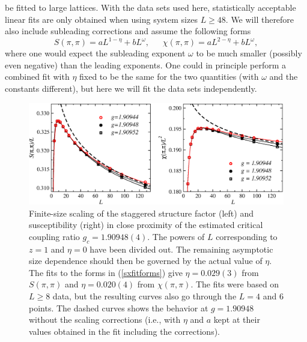 \documentclass[draft,numberedheadings]{aipproc}
\begin{document}
be fitted to large lattices. With the data sets used here, statistically acceptable linear fits are only obtained when using system sizes $L\ge 48$. We will 
therefore also include subleading corrections and assume the following forms
\begin{equation}
S(\pi,\pi) = aL^{1-\eta}+bL^{\omega},~~~~~~~\chi(\pi,\pi) = aL^{2-\eta}+bL^{\omega},
\label{sxfitforms}
\end{equation}
where one would expect the subleading exponent $\omega$ to be much smaller (possibly even negative) than the leading exponents. One could in principle 
perform a combined fit with $\eta$ fixed to be the same for the two quantities (with $\omega$ and the constants different), but here we will fit the 
data sets independently.

\begin{figure}
\includegraphics[width=14cm, clip]{dimsx.eps}
\caption{Finite-size scaling of the staggered structure factor (left) and susceptibility (right) in close proximity of the estimated critical coupling 
ratio $g_c=1.90948(4)$. The powers of $L$ corresponding to $z=1$ and $\eta=0$ have been divided out. The remaining asymptotic size dependence should then 
be governed by the actual value of $\eta$. The fits to the forms in (\ref{sxfitforms}) give $\eta=0.029(3)$ from $S(\pi,\pi)$ and $\eta=0.020(4)$ from 
$\chi(\pi,\pi)$. The fits were based on $L\ge 8$ data, but the resulting curves also go through the $L=4$ and $6$ points. The dashed curves shows the 
behavior at $g=1.90948$ without the scaling corrections (i.e., with $\eta$ and $a$ kept at their values obtained in the fit including the corrections).}
\label{dimsx}
\end{figure}
\end{document}
